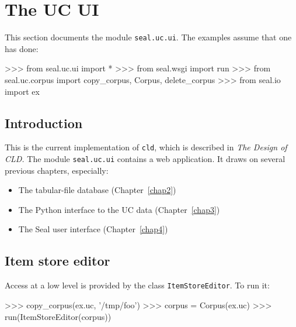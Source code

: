 
\section{The UC UI}

This section documents the module {\tt seal.uc.ui}.  The examples
assume that one has done:
\begin{python}
>>> from seal.uc.ui import *
>>> from seal.wsgi import run
>>> from seal.uc.corpus import copy_corpus, Corpus, delete_corpus
>>> from seal.io import ex
\end{python}

\subsection{Introduction}

This is the current implementation of {\tt cld}, which is described in
{\it The Design of CLD.\/}  The module {\tt seal.uc.ui} contains a web
application.  It draws on several previous chapters, especially:
\begin{itemize}
\item The tabular-file database (Chapter~\ref{chap2})
\item The Python interface to the UC data (Chapter~\ref{chap3})
\item The Seal user interface (Chapter~\ref{chap4})
\end{itemize}


\subsection{Item store editor}

Access at a low level is provided by the class {\tt ItemStoreEditor}.
To run it:
\begin{myverb}
>>> copy_corpus(ex.uc, '/tmp/foo')
>>> corpus = Corpus(ex.uc)
>>> run(ItemStoreEditor(corpus))
\end{myverb}
